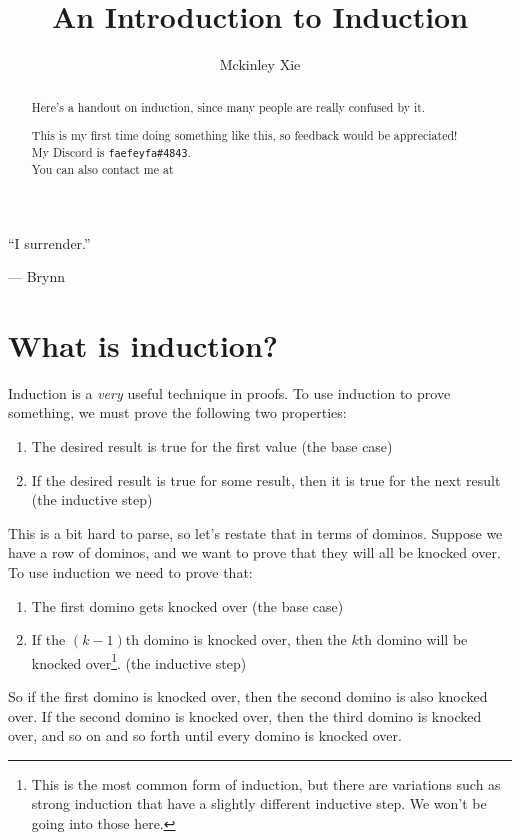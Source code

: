 \documentclass[a4paper]{scrartcl}
\title{An Introduction to Induction}
\author{Mckinley Xie}
\begin{document}
\maketitle
\epigraph{``I surrender.''}{ --- Brynn}



\begin{abstract}
Here's a handout on induction, since many people are really confused by it.

This is my first time doing something like this, so feedback would be appreciated! \\
My Discord is \texttt{faefeyfa\#4843}.\\ 
You can also contact me at 
\end{abstract}

\tableofcontents

\section{What is induction?}
Induction is a \emph{very} useful technique in proofs. To use induction to prove something, we must prove the following two properties:

\begin{enumerate}
	\item The desired result is true for the first value (the base case)
	\item If the desired result is true for some result, then it is true for the next result (the inductive step)
\end{enumerate}

This is a bit hard to parse, so let's restate that in terms of dominos. Suppose we have a row of dominos, and we want to prove that they will all be knocked over. To use induction we need to prove that:
\begin{enumerate}
	\item The first domino gets knocked over (the base case)
	\item If the $(k-1)$th domino is knocked over, then the $k$th domino will be knocked over\footnote{This is the most common form of induction, but there are variations such as strong induction that have a slightly different inductive step. We won't be going into those here.}. (the inductive step)
\end{enumerate}
So if the first domino is knocked over, then the second domino is also knocked over. If the second domino is knocked over, then the third domino is knocked over, and so on and so forth until every domino is knocked over.
\end{document}
